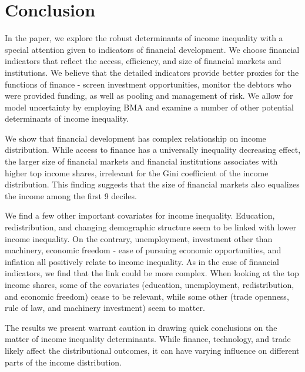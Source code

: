 \documentclass[preprint, nonatbib, 10pt]{elsarticle}
\begin{document}
%
%
%
%
%

\section{Conclusion}
\label{ch4sec:conclusion}
In the paper, we explore the robust determinants of income inequality with a special attention given to indicators of financial development. We choose financial indicators that reflect the access, efficiency, and size of financial markets and institutions. We believe that the detailed indicators provide better proxies for the functions of finance - screen investment opportunities, monitor the debtors who were provided funding, as well as pooling and management of risk. We allow for model uncertainty by employing \ac{BMA} and examine a number of other potential determinants of income inequality. 

We show that financial development has complex relationship on income distribution. While access to finance has a universally inequality decreasing effect, the larger size of financial markets and financial institutions associates with higher top income shares, irrelevant for the Gini coefficient of the income distribution. This finding suggests that the size of financial markets also equalizes the income among the first 9 deciles. 

We find a few other important covariates for income inequality. Education, redistribution, and changing demographic structure seem to be linked with lower income inequality. On the contrary, unemployment, investment other than machinery, economic freedom - ease of pursuing economic opportunities, and inflation all positively relate to income inequality. As in the case of financial indicators, we find that the link could be more complex. When looking at the top income shares, some of the covariates (education, unemployment, redistribution, and economic freedom) cease to be relevant, while some other (trade openness, rule of law, and machinery investment) seem to matter.

The results we present warrant caution in drawing quick conclusions on the matter of income inequality determinants. While finance, technology, and trade likely affect the distributional outcomes, it can have varying influence on different parts of the income distribution.

\end{document}
